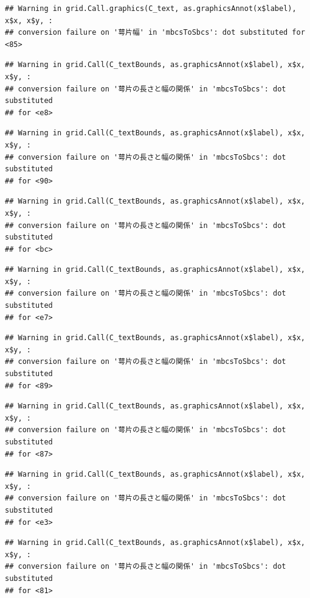 \documentclass[
]{book}
\begin{document}
\begin{verbatim}
## Warning in grid.Call.graphics(C_text, as.graphicsAnnot(x$label), x$x, x$y, :
## conversion failure on '萼片幅' in 'mbcsToSbcs': dot substituted for <85>
\end{verbatim}

\begin{verbatim}
## Warning in grid.Call(C_textBounds, as.graphicsAnnot(x$label), x$x, x$y, :
## conversion failure on '萼片の長さと幅の関係' in 'mbcsToSbcs': dot substituted
## for <e8>
\end{verbatim}

\begin{verbatim}
## Warning in grid.Call(C_textBounds, as.graphicsAnnot(x$label), x$x, x$y, :
## conversion failure on '萼片の長さと幅の関係' in 'mbcsToSbcs': dot substituted
## for <90>
\end{verbatim}

\begin{verbatim}
## Warning in grid.Call(C_textBounds, as.graphicsAnnot(x$label), x$x, x$y, :
## conversion failure on '萼片の長さと幅の関係' in 'mbcsToSbcs': dot substituted
## for <bc>
\end{verbatim}

\begin{verbatim}
## Warning in grid.Call(C_textBounds, as.graphicsAnnot(x$label), x$x, x$y, :
## conversion failure on '萼片の長さと幅の関係' in 'mbcsToSbcs': dot substituted
## for <e7>
\end{verbatim}

\begin{verbatim}
## Warning in grid.Call(C_textBounds, as.graphicsAnnot(x$label), x$x, x$y, :
## conversion failure on '萼片の長さと幅の関係' in 'mbcsToSbcs': dot substituted
## for <89>
\end{verbatim}

\begin{verbatim}
## Warning in grid.Call(C_textBounds, as.graphicsAnnot(x$label), x$x, x$y, :
## conversion failure on '萼片の長さと幅の関係' in 'mbcsToSbcs': dot substituted
## for <87>
\end{verbatim}

\begin{verbatim}
## Warning in grid.Call(C_textBounds, as.graphicsAnnot(x$label), x$x, x$y, :
## conversion failure on '萼片の長さと幅の関係' in 'mbcsToSbcs': dot substituted
## for <e3>
\end{verbatim}

\begin{verbatim}
## Warning in grid.Call(C_textBounds, as.graphicsAnnot(x$label), x$x, x$y, :
## conversion failure on '萼片の長さと幅の関係' in 'mbcsToSbcs': dot substituted
## for <81>
\end{verbatim}
\end{document}
